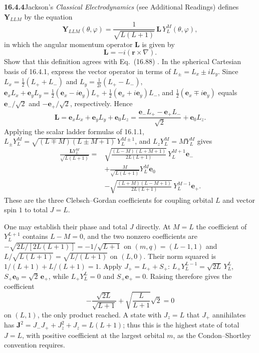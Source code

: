 \par\bigskip
\noindent\textbf{16.4.4}\quad Jackson's \emph{Classical
Electrodynamics} (see Additional Readings) defines
$\mathbf{Y}_{LLM}$ by the equation
\[
\mathbf{Y}_{LLM}(\theta,\varphi)
=\frac{1}{\sqrt{L(L+1)}}\,\mathbf{L}\,Y_{L}^{M}(\theta,\varphi),
\]
in which the angular momentum operator $\mathbf{L}$ is given by
\[
\mathbf{L}=-i(\mathbf{r}\times\nabla).
\]
Show that this definition agrees with Eq.~(16.88)
.
\solution
{}
In the spherical Cartesian basis of 16.4.1, express the vector
operator in terms of $L_\pm=L_x\pm iL_y$. Since
$L_x=\frac12(L_++L_-)$ and $L_y=\frac1{2i}(L_+-L_-)$,
$\mathbf e_xL_x+\mathbf e_yL_y
=\frac12(\mathbf e_x-i\mathbf e_y)L_++\frac12(\mathbf e_x+i\mathbf e_y)L_-$,
and $\frac12(\mathbf e_x\mp i\mathbf e_y)$ equals
$\mathbf e_-/\sqrt2$ and $-\mathbf e_+/\sqrt2$, respectively. Hence
\[
\mathbf L=\mathbf e_xL_x+\mathbf e_yL_y+\mathbf e_0L_z
=\frac{\mathbf e_-L_+-\mathbf e_+L_-}{\sqrt2}+\mathbf e_0L_z.
\]
Applying the scalar ladder formulas of 16.1.1,
$L_\pm Y_L^M=\sqrt{(L\mp M)(L\pm M+1)}\,Y_L^{M\pm1}$, and
$L_zY_L^M=MY_L^M$ gives
\[
\begin{aligned}
\frac{\mathbf L Y_L^M}{\sqrt{L(L+1)}}={}&
\sqrt{\frac{(L-M)(L+M+1)}{2L(L+1)}}\,Y_L^{M+1}\mathbf e_-\\
&+\frac{M}{\sqrt{L(L+1)}}Y_L^M\mathbf e_0\\
&-\sqrt{\frac{(L+M)(L-M+1)}{2L(L+1)}}\,Y_L^{M-1}\mathbf e_+.
\end{aligned}
\]
These are the three Clebsch--Gordan coefficients for coupling
orbital $L$ and vector spin $1$ to total $J=L$.

One may establish their phase and total $J$ directly. At $M=L$
the coefficient of $Y_L^{L+1}$ contains $L-M=0$, and the two nonzero
coefficients are
$-\sqrt{2L/[2L(L+1)]}=-1/\sqrt{L+1}$ on $(m,q)=(L-1,1)$ and
$L/\sqrt{L(L+1)}=\sqrt{L/(L+1)}$ on $(L,0)$. Their norm squared is
$1/(L+1)+L/(L+1)=1$.
Apply $J_+=L_++S_+$: $L_+Y_L^{L-1}=\sqrt{2L}\,Y_L^L$,
$S_+\mathbf e_0=\sqrt2\,\mathbf e_+$, while $L_+Y_L^L=0$ and
$S_+\mathbf e_+=0$. Raising therefore gives the coefficient
\[
-\frac{\sqrt{2L}}{\sqrt{L+1}}
+\sqrt{\frac{L}{L+1}}\sqrt2=0
\]
on $(L,1)$, the only product reached. A state with $J_z=L$ that
$J_+$ annihilates has $\mathbf J^2=J_-J_++J_z^2+J_z=L(L+1)$; thus
this is the highest state of total $J=L$, with positive coefficient
at the largest orbital $m$, as the Condon--Shortley convention
requires.

